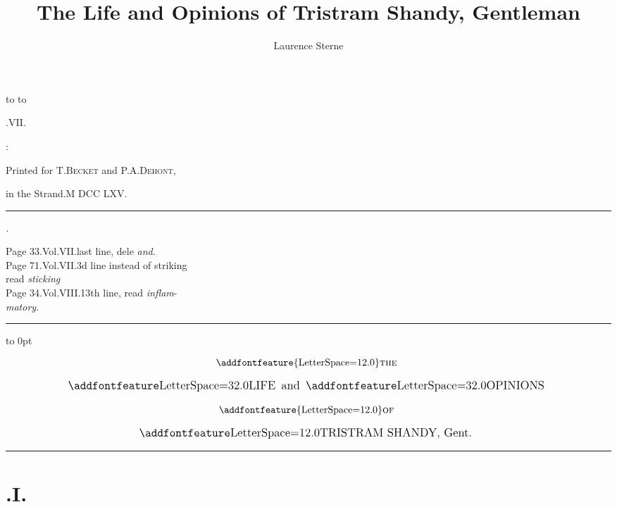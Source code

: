 \documentclass{article}
\title{The Life and Opinions of Tristram Shandy, Gentleman}
\author{Laurence Sterne}
\begin{document}
\pagestyle{empty}
\centerline{\vbox{\openup 10pt}}
\vfill
\noindent
\hbox to 
\hbox to 
\vfill
\centerline{.\quad VII.}
\vfill
\centerline{:}
\centerline{\small Printed for T.\@ \textsc{Becket} and P.\@ A.\@  \textsc{Dehont},\rlap{\quad\club}}
\centerline{\small in the Strand.\quad M DCC LXV.}

\newpage
\null
\vfill
\bgroup\small
\hrule
\bigskip

\centerline{\itshape{}.}

\noindent
Page 33.\@ Vol.\@ VII.\@ last line, dele \textit{and}.\\[2pt]
Page 71.\@ Vol.\@ VII.\@ 3d line instead of striking\\[2pt]
\null\quad read \textit{sticking}\\[2pt]
Page 34.\@ Vol.\@ VIII.\@ 13th line, read \textit{inflam}-\\[2pt]
\null\quad \textit{matory}.

\bigskip
\hrule
\egroup
\vfill
\newpage
\pagestyle{fancy}
\thispagestyle{empty}
\setcounter{page}{1}
\hbox{}\vskip -36pt
\moveright 88pt\vbox to 0pt{\hsize
40pt\vss}

\[\vbox{\openup 12pt\halign{\hss # \hss\cr
\addfontfeature{LetterSpace=12.0}\textsc{the}\cr
\large \lsss{LIFE}\enspace and\enspace \lsss{OPINIONS}\cr
\addfontfeature{LetterSpace=12.0}\textsc{of}\cr
\large \ls{TRISTRAM SHANDY}, Gent.\cr}}\]

\vskip 12pt
\hrule

\setlength{\baselineskip}{14pt}  %
\sloppy





\section{.\enspace I.}
\end{document}
